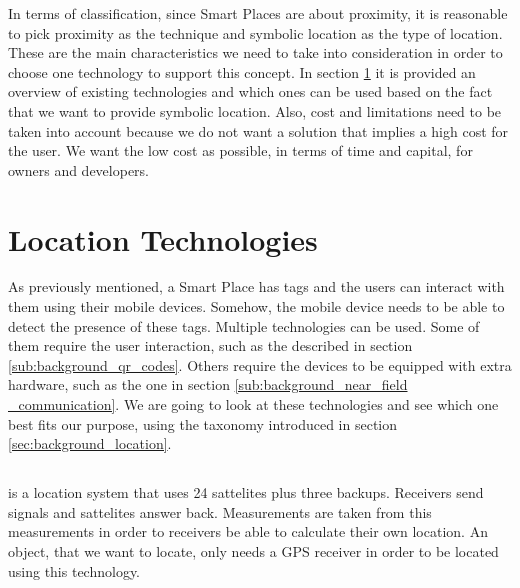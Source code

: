In terms of classification, since Smart Places are about proximity, it is reasonable to pick proximity as the technique and symbolic location as the type of location.
These are the main characteristics we need to take into consideration in order to choose one technology to support this concept.
In section \ref{sec:background_technologies} it is provided an overview of existing technologies and which ones can be used based on the fact that we want to provide symbolic location.
Also, cost and limitations need to be taken into account because we do not want a solution that implies a high cost for the user.
We want the low cost as possible, in terms of time and capital, for owners and developers.

\section{Location Technologies}
\label{sec:background_technologies}
As previously mentioned, a Smart Place has tags and the users can interact with them using their mobile devices.
Somehow, the mobile device needs to be able to detect the presence of these tags.
Multiple technologies can be used.
Some of them require the user interaction, such as the described in section \ref{sub:background_qr_codes}.
Others require the devices to be equipped with extra hardware, such as the one in section \ref{sub:background_near_field _communication}.
We are going to look at these technologies and see which one best fits our purpose, using the taxonomy introduced in section \ref{sec:background_location}.

\subsection{}
\label{sub:background_gps}
 is a location system that uses 24 sattelites plus three backups.
Receivers send signals and sattelites answer back. Measurements are taken from this measurements in order to receivers be able to calculate their own location.
An object, that we want to locate, only needs a \gls{GPS} receiver in order to be located using this technology.

